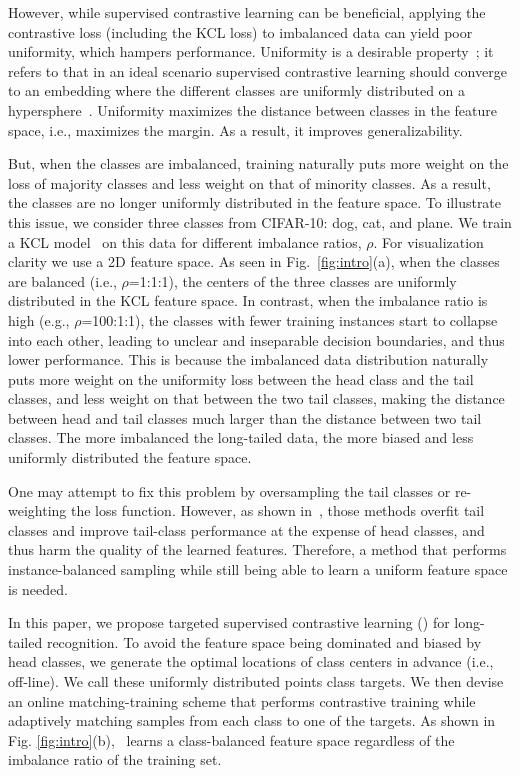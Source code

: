 However, while supervised contrastive learning can be beneficial, applying the contrastive loss (including the KCL loss) to imbalanced data can yield poor uniformity, which hampers performance. Uniformity is a desirable property~\cite{wang2020long}; it refers to that in an ideal scenario supervised contrastive learning should converge to an embedding where the different classes are uniformly distributed on a hypersphere~\cite{wang2020long,graf2021dissecting}. Uniformity maximizes the distance between classes in the feature space, i.e., maximizes the margin. As a result, it improves  generalizability. 

But, when the classes are imbalanced, training naturally puts more weight on the loss of majority classes and less weight on that of minority classes. As a result, the classes are no longer uniformly distributed in the feature space. To illustrate this issue, we consider three classes from CIFAR-10: dog, cat, and plane. We train a KCL model~\cite{kang2020exploring} on this data for different imbalance ratios, $\rho$. For visualization clarity we use a 2D feature space. As seen in Fig.~\ref{fig:intro}(a), when the classes are balanced (i.e., $\rho$=1:1:1), the centers of the three classes are uniformly distributed in the KCL feature space. In contrast, when the imbalance ratio is high  (e.g., $\rho$=100:1:1), the classes with fewer training instances start to collapse into each other, leading to unclear and inseparable decision boundaries, and thus lower performance. This is because the imbalanced data distribution naturally puts more weight on the uniformity loss between the head class and the tail classes, and less weight on that between the two tail classes, making the distance between head and tail classes much larger than the distance between two tail classes. The more imbalanced the long-tailed data, the more biased and less uniformly distributed the feature space.

One may attempt to fix this problem by oversampling the tail classes or re-weighting the loss function. However,  as shown in~\cite{kang2019decoupling}, those methods overfit tail classes and improve tail-class performance at the expense of head classes, and thus harm the quality of the learned features. 
Therefore, a method that performs instance-balanced sampling while still being able to learn a uniform feature space is needed. 

In this paper, we propose targeted supervised contrastive learning (\name) for long-tailed recognition. To avoid the feature space being dominated and biased by head classes, we generate the optimal locations of class centers in advance (i.e., off-line). We call these uniformly distributed points class targets. We then devise 
 an online matching-training scheme that performs contrastive training while adaptively matching samples from each class to one of the targets. As shown in Fig. \ref{fig:intro}(b), \name~learns a class-balanced feature space regardless of the imbalance ratio of the training set.
 
